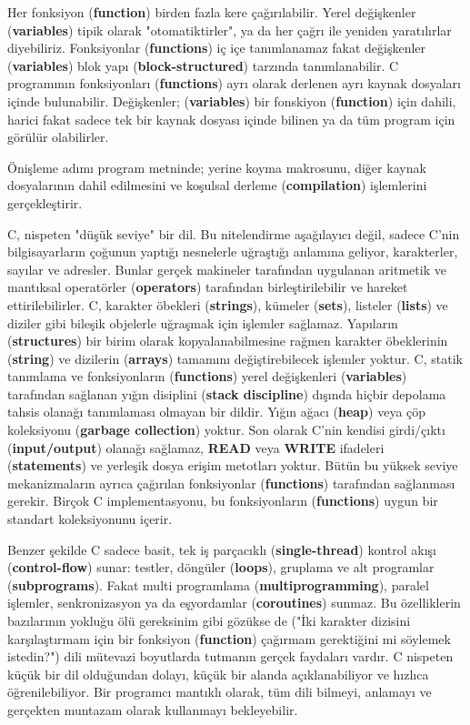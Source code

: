 \documentclass[a4paper,12pt,oneside]{book}
\begin{document}
\thispagestyle{introduction} \noindent Her fonksiyon (\textbf{function}) birden fazla kere çağırılabilir. Yerel değişkenler (\textbf{variables}) tipik olarak "otomatiktirler", ya da her çağrı ile yeniden yaratılırlar diyebiliriz. Fonksiyonlar (\textbf{functions}) iç içe tanımlanamaz fakat değişkenler (\textbf{variables}) blok yapı (\textbf{block-structured}) tarzında tanımlanabilir. C programının fonksiyonları (\textbf{functions}) ayrı olarak derlenen ayrı kaynak dosyaları içinde bulunabilir. Değişkenler; (\textbf{variables}) bir fonskiyon (\textbf{function}) için dahili, harici fakat sadece tek bir kaynak dosyası içinde bilinen ya da tüm program için görülür olabilirler.
\par Önişleme adımı program metninde; yerine koyma makrosunu, diğer kaynak dosyalarının dahil edilmesini ve koşulsal derleme (\textbf{compilation}) işlemlerini gerçekleştirir. \newline
\par C, nispeten "düşük seviye" bir dil. Bu nitelendirme aşağılayıcı değil, sadece C'nin bilgisayarların çoğunun yaptığı nesnelerle uğraştığı anlamına geliyor, karakterler, sayılar ve adresler. Bunlar gerçek makineler tarafından uygulanan aritmetik ve mantıksal operatörler (\textbf{operators}) tarafından birleştirilebilir ve hareket ettirilebilirler. C, karakter öbekleri (\textbf{strings}), kümeler (\textbf{sets}), listeler (\textbf{lists}) ve diziler gibi bileşik objelerle uğraşmak için işlemler sağlamaz. Yapıların (\textbf{structures}) bir birim olarak kopyalanabilmesine rağmen karakter öbeklerinin (\textbf{string}) ve dizilerin (\textbf{arrays}) tamamını değiştirebilecek işlemler yoktur. C, statik tanımlama ve fonksiyonların (\textbf{functions}) yerel değişkenleri (\textbf{variables}) tarafından sağlanan yığın disiplini (\textbf{stack discipline}) dışında hiçbir depolama tahsis olanağı tanımlaması olmayan bir dildir. Yığın ağacı (\textbf{heap}) veya çöp koleksiyonu (\textbf{garbage collection}) yoktur. Son olarak C'nin kendisi girdi/çıktı (\textbf{input/output}) olanağı sağlamaz, \textbf{READ} veya \textbf{WRITE} ifadeleri (\textbf{statements}) ve yerleşik dosya erişim metotları yoktur. Bütün bu yüksek seviye mekanizmaların ayrıca çağırılan fonksiyonlar (\textbf{functions}) tarafından sağlanması gerekir. Birçok C implementasyonu, bu fonksiyonların (\textbf{functions}) uygun bir standart koleksiyonunu içerir.
\par Benzer şekilde C sadece basit, tek iş parçacıklı (\textbf{single-thread}) kontrol akışı (\textbf{control-flow}) sunar: testler, döngüler (\textbf{loops}), gruplama ve alt programlar (\textbf{subprograms}). Fakat multi programlama (\textbf{multiprogramming}), paralel işlemler, senkronizasyon ya da eşyordamlar (\textbf{coroutines}) sunmaz. Bu özelliklerin bazılarının yokluğu ölü gereksinim gibi gözükse de ("İki karakter dizisini karşılaştırmam için bir fonksiyon (\textbf{function}) çağırmam gerektiğini mi söylemek istedin?") dili mütevazi boyutlarda tutmanın gerçek faydaları vardır. C nispeten küçük bir dil olduğundan dolayı, küçük bir alanda açıklanabiliyor ve hızlıca öğrenilebiliyor. Bir programcı mantıklı olarak, tüm dili bilmeyi, anlamayı ve gerçekten muntazam olarak kullanmayı bekleyebilir. \pagebreak
\end{document}
